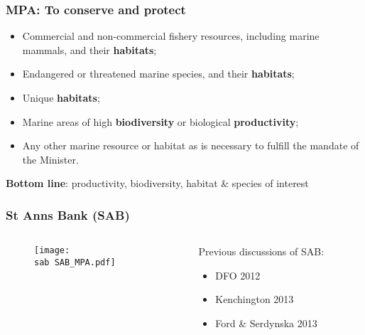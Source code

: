 \documentclass{beamer}
\numberwithin{equation}{section}		%
\numberwithin{figure}{section}		%
\numberwithin{table}{section}				%
\newcommand{\ecomod}{\string~/ecomod_data/}   %
\newcommand{\sab}{\ecomod/mpa/sab/}   %
\newcommand{\analysis}{\ecomod/mpa/analysis/}   %
\begin{document}
\begin{frame}
  \frametitle{MPA: To conserve and protect}

  \begin{itemize}
    \item Commercial and non-commercial fishery resources, including marine mammals, and their \textbf{habitats}; 
    \item Endangered or threatened marine species, and their \textbf{habitats}; 
    \item Unique \textbf{habitats}; 
    \item Marine areas of high \textbf{biodiversity} or biological \textbf{productivity};  
    \item Any other marine resource or habitat as is necessary to fulfill the mandate of the Minister.
\end{itemize}

\medskip

\textbf{Bottom line}: productivity, biodiversity, habitat \& species of interest

\end{frame}
  


\begin{frame}
  \frametitle{St Anns Bank (SAB)}
    \begin{columns}[c]
      \begin{column}{.6\textwidth}
        \begin{figure}[h]
          \centering
          \texttt{[image: \\sab SAB\_MPA.pdf]}
          \label{fig:SABCloseup}
        \end{figure} 
      \end{column}
      \begin{column}{.4\textwidth}
        Previous discussions of SAB:
        \begin{itemize}
          \item DFO 2012
          \item Kenchington 2013
          \item Ford \& Serdynska 2013
        \end{itemize}
      \end{column}
    \end{columns}
\end{frame}
\end{document}
